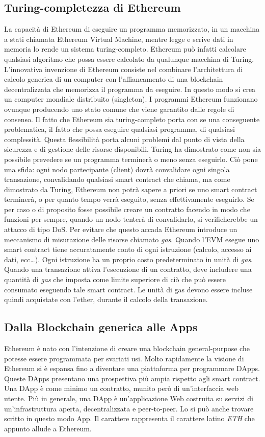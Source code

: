 \subsection{Turing-completezza di Ethereum}
La capacità di Ethereum di eseguire un programma memorizzato, in un macchina a stati chiamata Ethereum Virtual Machine, mentre legge e scrive dati in memoria lo rende un sistema turing-completo. Ethereum può infatti calcolare qualsiasi algoritmo che possa essere calcolato da qualunque macchina di Turing.
L'innovativa invenzione di Ethereum consiste nel combinare l'architettura di calcolo generica di un computer con l'affiancamento di una blockchain decentralizzata che memorizza il programma da eseguire. In questo modo si crea un computer mondiale distribuito (singleton). I programmi Ethereum funzionano ovunque producendo uno stato comune che viene garantito dalle regole di consenso. 
Il fatto che Ethereum sia turing-completo porta con se una conseguente problematica, il fatto che possa eseguire qualsiasi programma, di qualsiasi complessità. Questa flessibilità porta alcuni problemi dal punto di vista della sicurezza e di gestione delle risorse disponibili. 
Turing ha dimostrato come non sia possibile prevedere se un programma terminerà o meno senza eseguirlo. Ciò pone una sfida: ogni nodo partecipante (client) dovrà convalidare ogni singola transazione, convalidando qualsiasi smart contract che chiama, ma come dimostrato da Turing, Ethereum non potrà sapere a priori se uno smart contract terminerà, o per quanto tempo verrà eseguito, senza effettivamente eseguirlo. Se per caso o di proposito fosse possibile creare un contratto facendo in modo che funzioni per sempre, quando un nodo tenterà di convalidarlo, si verificherebbe un attacco di tipo DoS. Per evitare che questo accada Ethereum introduce un meccanismo di misurazione delle risorse chiamato \textit{gas}. Quando l'EVM esegue uno smart contract tiene accuratamente conto di ogni istruzione (calcolo, accesso ai dati, ecc\dots). Ogni istruzione ha un proprio costo predeterminato in unità di \textit{gas}. Quando una transazione attiva l'esecuzione di un contratto, deve includere una quantità di \textit{gas} che imposta come limite superiore di ciò che può essere consumato eseguendo tale smart contract. Le unità di gas devono essere incluse quindi acquistate con l'ether, durante il calcolo della transazione.

\subsection{Dalla Blockchain generica alle \DH Apps}
Ethereum è nato con l'intenzione di creare una blockchain general-purpose che potesse essere programmata per svariati usi. Molto rapidamente la visione di Ethereum si è espansa fino a diventare una piattaforma per programmare DApps. Queste DApps presentano una prospettiva più ampia rispetto agli smart contract. Una DApp è come minimo un contratto, munito però di un'interfaccia web utente. Più in generale, una DApp è un'applicazione Web costruita su servizi di un'infrastruttura aperta, decentralizzata e peer-to-peer. Lo si può anche trovare scritto in questo modo \DH App. Il carattere \DH rappresenta il carattere latino \textit{ETH} che appunto allude a Ethereum.

